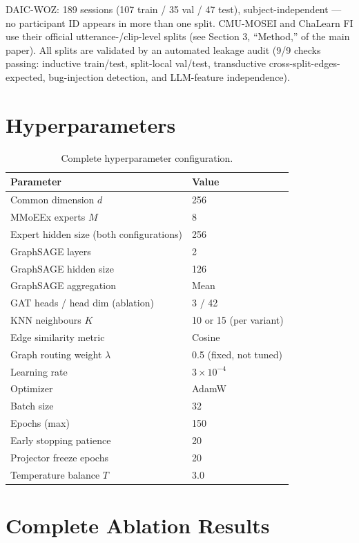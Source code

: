 \documentclass[letterpaper]{article}
\begin{document}
DAIC-WOZ: 189 sessions (107 train / 35 val / 47 test), subject-independent — no participant ID appears in more than one split. CMU-MOSEI and ChaLearn FI use their official utterance-/clip-level splits (see Section 3, ``Method,'' of the main paper). All splits are validated by an automated leakage audit (9/9 checks passing: inductive train/test, split-local val/test, transductive cross-split-edges-expected, bug-injection detection, and LLM-feature independence).

\section{Hyperparameters}

\begin{table}[t]
\centering
\caption{Complete hyperparameter configuration.}
\label{tab:hparams}
\small
\begin{tabular}{ll}
\toprule
Parameter & Value \\
\midrule
Common dimension $d$ & 256 \\
MMoEEx experts $M$ & 8 \\
Expert hidden size (both configurations) & 256 \\
GraphSAGE layers & 2 \\
GraphSAGE hidden size & 126 \\
GraphSAGE aggregation & Mean \\
GAT heads / head dim (ablation) & 3 / 42 \\
KNN neighbours $K$ & 10 or 15 (per variant) \\
Edge similarity metric & Cosine \\
Graph routing weight $\lambda$ & 0.5 (fixed, not tuned) \\
Learning rate & $3 \times 10^{-4}$ \\
Optimizer & AdamW \\
Batch size & 32 \\
Epochs (max) & 150 \\
Early stopping patience & 20 \\
Projector freeze epochs & 20 \\
Temperature balance $T$ & 3.0 \\
\bottomrule
\end{tabular}
\end{table}

\section{Complete Ablation Results}
\end{document}
